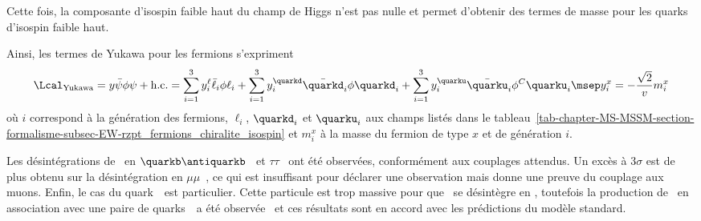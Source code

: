Cette fois, la composante d'isospin faible haut du champ de Higgs n'est pas nulle et permet d'obtenir des termes de masse pour les quarks d'isospin faible haut.
\par Ainsi, les termes de Yukawa pour les fermions s'expriment
\begin{equation}
\Lcal_\text{Yukawa}
=
y \bar{\psi} \phi \psi + \text{h.c.}
=
\sum_{i=1}^3 y_i^\ell \bar{\ell}_i \phi \ell_i
+ \sum_{i=1}^3 y_i^\quarkd \bar{\quarkd}_i \phi \quarkd_i
+ \sum_{i=1}^3 y_i^\quarku \bar{\quarku}_i \phi^C \quarku_i
\msep
y_i^x = -\frac{\sqrt{2}}{v}m_i^x
\label{eq-chapter-MS-MSSM-section-formalisme-subsec-Higgs_mechanism-subsubsec-fermions-Yukawa_couplings}
\end{equation}
où
$i$ correspond à la génération des fermions,
$\ell_i$, $\quarkd_i$ et $\quarku_i$ aux champs listés dans le tableau~\ref{tab-chapter-MS-MSSM-section-formalisme-subsec-EW-rzpt_fermions_chiralite_isospin}
et
$m_i^x$ à la masse du fermion de type $x$ et de génération $i$.
\par
Les désintégrations de \higgs\
en
$\quarkb\antiquarkb$~\cite{Chatrchyan:2013qga,PhysRevD.89.012003}
et
$\tau\tau$~\cite{Chatrchyan:2014nva}
ont été observées, conformément aux couplages attendus.
Un excès à $3\sigma$
est de plus obtenu sur la désintégration en $\mu\mu$~\cite{CMS-PAS-HIG-19-006},
ce qui est insuffisant pour déclarer une observation mais donne une preuve du couplage aux muons.
Enfin, le cas du quark~\quarkt\ est particulier.
Cette particule est trop massive pour que \higgs\ se désintègre en \quarkt\antiquarkt,
toutefois
la production de \higgs\ en association avec une paire de quarks~\quarkt\ a été observée~\cite{PhysRevLett.120.231801}
et ces résultats sont en accord avec les prédictions du modèle standard.
